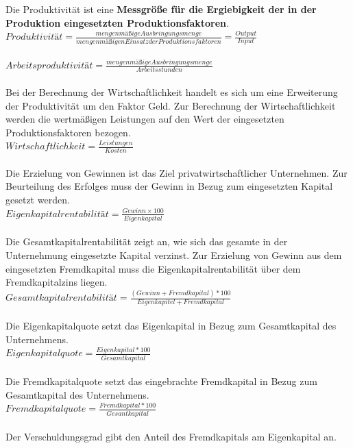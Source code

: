 Die Produktivität ist eine {\bf Messgröße für die Ergiebigkeit der in der Produktion eingesetzten Produktionsfaktoren}. \\
$Produktivität = \frac{mengenmäßige Ausbringungsmenge}{mengenmäßigen Einsatz der Produktionsfaktoren} = \frac{Output}{Input}$\\
\\
$Arbeitsproduktivität = \frac{mengenmäßige Ausbringungsmenge}{Arbeitsstunden}$\\
\\
Bei der Berechnung der Wirtschaftlichkeit handelt es sich um eine Erweiterung der Produktivität um den Faktor Geld. Zur Berechnung der Wirtschaftlichkeit werden die wertmäßigen Leistungen auf den Wert der eingesetzten Produktionsfaktoren bezogen.\\
$Wirtschaftlichkeit = \frac{Leistungen}{Kosten}$\\
\\
Die Erzielung von Gewinnen ist das Ziel privatwirtschaftlicher Unternehmen. Zur Beurteilung des Erfolges muss der Gewinn in Bezug zum eingesetzten Kapital gesetzt werden.\\
$Eigenkapitalrentabilität = \frac{Gewinn \times 100}{Eigenkapital}$\\
\\
Die Gesamtkapitalrentabilität zeigt an, wie sich das gesamte in der Unternehmung eingesetzte Kapital verzinst. Zur Erzielung von Gewinn aus dem eingesetzten Fremdkapital muss die Eigenkapitalrentabilität über dem Fremdkapitalzins liegen.\\
$Gesamtkapitalrentabilität = \frac{(Gewinn + Fremdkapital) * 100}{Eigenkapitel + Fremdkapital}$\\
\\
Die Eigenkapitalquote setzt das Eigenkapital in Bezug zum Gesamtkapital des Unternehmens.\\
$Eigenkapitalquote = \frac{Eigenkapital * 100}{Gesamtkapital}$\\
\\
Die Fremdkapitalquote setzt das eingebrachte Fremdkapital in Bezug zum Gesamtkapital des Unternehmens.\\
$Fremdkapitalquote = \frac{Fremdkapital * 100}{Gesantkapital}$\\
\\
Der Verschuldungsgrad gibt den Anteil des Fremdkapitals am Eigenkapital an.\\
